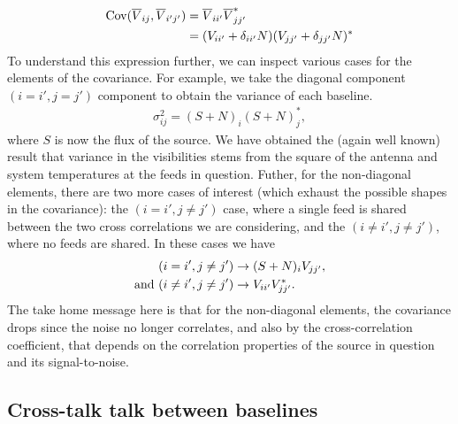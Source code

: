 \begin{align}
{\rm Cov}(\overline{V}_{ij}, \overline{V}_{i'j'}) &= \overline{V}_{ii'}\overline{V}_{jj'}^*  \label{fullcov-obsvis}
\\ & = (V_{ii'} + \delta_{ii'} N)(V_{jj'} + \delta_{jj'} N)^*
\end{align}
To understand this expression further, we can inspect various cases for the elements of the covariance. For example, we take the diagonal component $(i=i', j=j')$ component to obtain the variance of each baseline.
\begin{align}
\sigma^2_{ij} = (S + N)_{i}(S + N)^*_{j},
\end{align}
where $S$ is now the flux of the source. We have obtained the (again well known) result that variance in the visibilities stems from the square of the antenna and system temperatures at the feeds in question. Futher, for the non-diagonal elements, there are two more cases of interest (which exhaust the possible shapes in the covariance): the $(i=i', j\neq j')$ case, where a single feed is shared between the two cross correlations we are considering, and the $(i\neq i', j\neq j')$, where no feeds are shared. In these cases we have
\begin{align}
(i=i', j\neq j') &\rightarrow (S + N)_{i} V_{jj'},
\\{\rm and~}(i\neq i', j\neq j') &\rightarrow V_{ii'} V^{*}_{jj'}.
\end{align}
The take home message here is that for the non-diagonal elements, the covariance drops since the noise no longer correlates, and also by the cross-correlation coefficient, that depends on the correlation properties of the source in question and its signal-to-noise.

\subsection{Cross-talk talk between baselines} 
\label{app:hol:sec:noise:ss:basecalcx}

